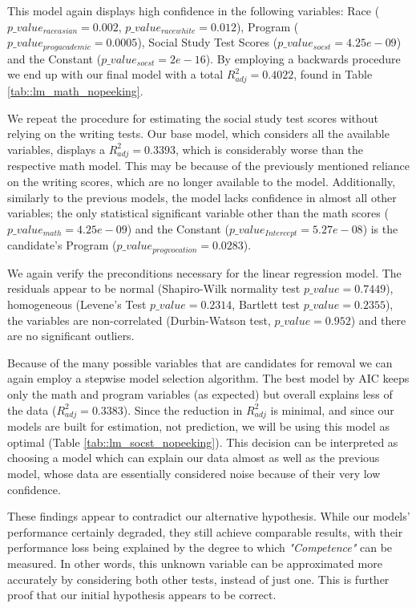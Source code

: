 \documentclass[10pt, a4paper]{article}
\begin{document}
	This model again displays high confidence in the following variables: Race ($p\_value_{raceasian} = 0.002$, $p\_value_{racewhite} = 0.012$), Program ($p\_value_{progacademic} = 0.0005$), Social Study Test Scores ($p\_value_{socst} = 4.25e-09$) and the Constant ($p\_value_{socst} = 2e-16$). By employing a backwards procedure we end up with our final model with a total $R^2_{adj} = 0.4022$, found in Table \ref{tab::lm_math_nopeeking}.
	
	
	
	We repeat the procedure for estimating the social study test scores without relying on the writing tests. Our base model, which considers all the available variables, displays a $R^2_{adj} = 0.3393$, which is considerably worse than the respective math model. This may be because of the previously mentioned reliance on the writing scores, which are no longer available to the model. Additionally, similarly to the previous models, the model lacks confidence in almost all other variables; the only statistical significant variable other than the math scores ($p\_value_{math} = 4.25e-09$) and the Constant ($p\_value_{Intercept} = 5.27e-08$) is the candidate's Program ($p\_value_{progvocation} = 0.0283$).
	
	We again verify the preconditions necessary for the linear regression model. The residuals appear to be normal (Shapiro-Wilk normality test $p\_value = 0.7449$), homogeneous (Levene's Test $p\_value = 0.2314$, Bartlett test $p\_value = 0.2355$), the variables are non-correlated (Durbin-Watson test, $p\_value=0.952$) and there are no significant outliers.
	
	Because of the many possible variables that are candidates for removal we can again employ a stepwise model selection algorithm. The best model by AIC keeps only the math and program variables (as expected) but overall explains less of the data ($R^2_{adj} = 0.3383$). Since the reduction in $R^2_{adj}$ is minimal, and since our models are built for estimation, not prediction, we will be using this model as optimal (Table \ref{tab::lm_socst_nopeeking}). This decision can be interpreted as choosing a model which can explain our data almost as well as the previous model, whose data are essentially considered noise because of their very low confidence.
	
	These findings appear to contradict our alternative hypothesis. While our models' performance certainly degraded, they still achieve comparable results, with their performance loss being explained by the degree to which \textit{"Competence"} can be measured. In other words, this unknown variable can be approximated more accurately by considering both other tests, instead of just one. This is further proof that our initial hypothesis appears to be correct.
	
\end{document}
